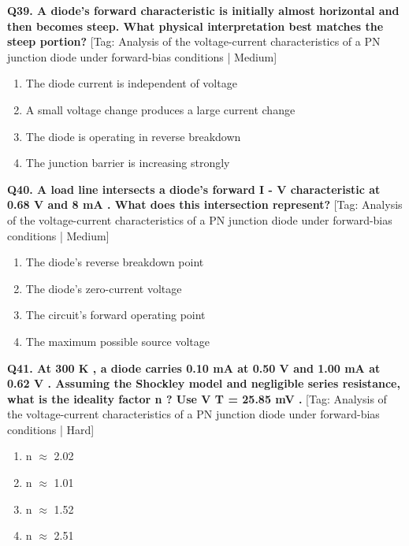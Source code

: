 \noindent\textbf{Q39. A diode's forward characteristic is initially almost horizontal and then becomes steep. What physical interpretation best matches the steep portion?} \hfill [Tag: Analysis of the voltage-current characteristics of a PN junction diode under forward-bias conditions | Medium]
\begin{enumerate}[label=(\alph*),topsep=2pt,itemsep=1pt,partopsep=0pt,parsep=0pt]
    \item {The diode current is independent of voltage}
    \item {A small voltage change produces a large current change}
    \item {The diode is operating in reverse breakdown}
    \item {The junction barrier is increasing strongly}
\end{enumerate}
\vspace{2mm}

\noindent\textbf{Q40. A load line intersects a diode's forward I - V characteristic at 0.68 V and 8 mA . What does this intersection represent?} \hfill [Tag: Analysis of the voltage-current characteristics of a PN junction diode under forward-bias conditions | Medium]
\begin{enumerate}[label=(\alph*),topsep=2pt,itemsep=1pt,partopsep=0pt,parsep=0pt]
    \item {The diode's reverse breakdown point}
    \item {The diode's zero-current voltage}
    \item {The circuit's forward operating point}
    \item {The maximum possible source voltage}
\end{enumerate}
\vspace{2mm}

\noindent\textbf{Q41. At 300 K , a diode carries 0.10 mA at 0.50 V and 1.00 mA at 0.62 V . Assuming the Shockley model and negligible series resistance, what is the ideality factor n ? Use V T = 25.85 mV .} \hfill [Tag: Analysis of the voltage-current characteristics of a PN junction diode under forward-bias conditions | Hard]
\begin{enumerate}[label=(\alph*),topsep=2pt,itemsep=1pt,partopsep=0pt,parsep=0pt]
    \item {n $\approx$ 2.02}
    \item {n $\approx$ 1.01}
    \item {n $\approx$ 1.52}
    \item {n $\approx$ 2.51}
\end{enumerate}
\vspace{2mm}


